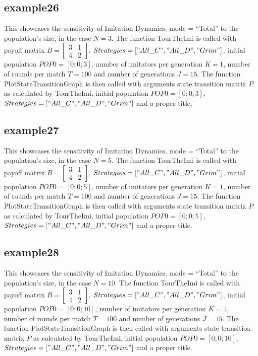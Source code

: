 \subsection{example26}
This showcases the sensitivity of Imitation Dynamics, mode = ``Total'' to the population's size, in the case $N=3$. The function TourTheImi is called with payoff matrix $B = \begin{bmatrix} 3 & 1 \\ 4 & 2 \end{bmatrix}$, $Strategies = ["All\_C", "All\_D", "Grim"]$, initial population $POP0 = [0; 0; 3]$, number of imitators per generation $K=1$, number of rounds per match $T = 100$ and number of generations $J = 15$. The function PlotStateTransitionGraph is then called with arguments state transition matrix $P$ as calculated by TourTheImi, initial population $POP0 = [0; 0; 3]$, $Strategies = ["All\_C", "All\_D", "Grim"]$ and a proper title.

\subsection{example27}
This showcases the sensitivity of Imitation Dynamics, mode = ``Total'' to the population's size, in the case $N=5$. The function TourTheImi is called with payoff matrix $B = \begin{bmatrix} 3 & 1 \\ 4 & 2 \end{bmatrix}$, $Strategies = ["All\_C", "All\_D", "Grim"]$, initial population $POP0 = [0; 0; 5]$, number of imitators per generation $K=1$, number of rounds per match $T = 100$ and number of generations $J = 15$. The function PlotStateTransitionGraph is then called with arguments state transition matrix $P$ as calculated by TourTheImi, initial population $POP0 = [0; 0; 5]$, $Strategies = ["All\_C", "All\_D", "Grim"]$ and a proper title.

\subsection{example28}
This showcases the sensitivity of Imitation Dynamics, mode = ``Total'' to the population's size, in the case $N=10$. The function TourTheImi is called with payoff matrix $B = \begin{bmatrix} 3 & 1 \\ 4 & 2 \end{bmatrix}$, $Strategies = ["All\_C", "All\_D", "Grim"]$, initial population $POP0 = [0; 0; 10]$, number of imitators per generation $K=1$, number of rounds per match $T = 100$ and number of generations $J = 15$. The function PlotStateTransitionGraph is then called with arguments state transition matrix $P$ as calculated by TourTheImi, initial population $POP0 = [0; 0; 10]$, $Strategies = ["All\_C", "All\_D", "Grim"]$ and a proper title.

